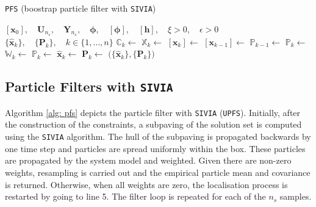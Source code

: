 \begin{algorithm*}[t]
\caption[Particle filter with \texttt{SIVIA} (\texttt{PFS})]{\texttt{PFS} (boostrap particle filter with \texttt{SIVIA})}
\label{alg: pfs}
\begin{algorithmic}[1]
\Require $[\bm{x}_0], \quad \bm{U}_{n_s}, \quad \bm{Y}_{n_s}, \quad \bm{\phi}, \quad [\bm{\phi}], \quad [\bm{h}], \quad \xi > 0, \quad \epsilon > 0$ 
\Ensure $\big\{\hat{\bm{x}}_k\big\}, \quad \big\{\bm{P}_k\big\}, \quad k \in \{1, \dots, n\}$
\Statex
{}
\State $\mathbb{C}_k \gets$  
 
	\State $\mathbb{X}_{k} \gets$  \label{marker} 
	\State $[\bm{x}_{k}] \gets$  \label{marker} 
	\State $[\bm{x}_{k-1}] \gets$  
    \State $\mathbb{P}_{k-1} \gets$  
 \EndIf
 \State $\mathbb{P}_{k} \gets$  
 \State $\mathbb{W}_{k} \gets$  
  
 \State {}
 \EndIf
 \State $\mathbb{P}_{k} \gets$  
 \State $\hat{\bm{x}}_k \gets$  
 \State $\bm{P}_k \gets$  
\EndFor
\State \Return $\Big(\big\{\hat{\bm{x}}_k\big\}, \big\{\bm{P}_k\big\}\Big)$ 
\EndFunction
\end{algorithmic}
\end{algorithm*}

\subsection{Particle Filters with \texttt{SIVIA}}


Algorithm \ref{alg: pfs} depicts the particle filter with \texttt{SIVIA} (\texttt{UPFS}). Initially, after the construction of the constraints, a subpaving of the solution set is computed using the \texttt{SIVIA} algorithm. The hull of the subpaving is propagated backwards by one time step and particles are spread uniformly within the box. These particles are propagated by the system model and weighted. Given there are non-zero weights, resampling is carried out and the empirical particle mean and covariance is returned. Otherwise, when all weights are zero, the localisation process is restarted by going to line 5. The filter loop is repeated for each of the $n_s$ samples.


